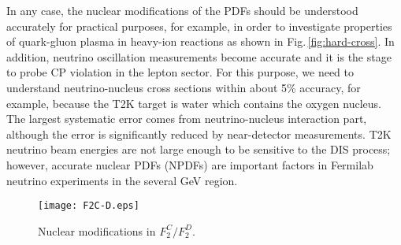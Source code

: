 \documentclass{PoS}
\begin{document}
In any case, the nuclear modifications of the PDFs should be understood
accurately for practical purposes, for example, 
in order to investigate properties of quark-gluon plasma 
in heavy-ion reactions as shown in 
Fig.\,\ref{fig:hard-cross}. In addition, neutrino oscillation measurements 
become accurate and it is the stage to probe CP violation
in the lepton sector. For this purpose, we need to understand
neutrino-nucleus cross sections within about 5\% accuracy,
for example, because the T2K target is water which contains 
the oxygen nucleus. The largest systematic error comes from
neutrino-nucleus interaction part, although the error is
significantly reduced by near-detector measurements.
T2K neutrino beam energies are not large enough
to be sensitive to the DIS process;
however, accurate nuclear PDFs (NPDFs) are important factors in
Fermilab neutrino experiments in the several GeV region.

\begin{wrapfigure}[12]{r}{0.45\textwidth}
    \hspace{-0.40cm}
\begin{minipage}[c]{0.45\textwidth}
    \vspace{-0.30cm}
   \begin{center}
    \texttt{[image: F2C-D.eps]}
   \end{center}
\vspace{-0.85cm}
\caption{Nuclear modifications in $F_2^C / F_2^D$.}
\label{fig:F2C-D}
\vspace{-0.5cm}
\end{minipage}
\end{wrapfigure}
\end{document}
